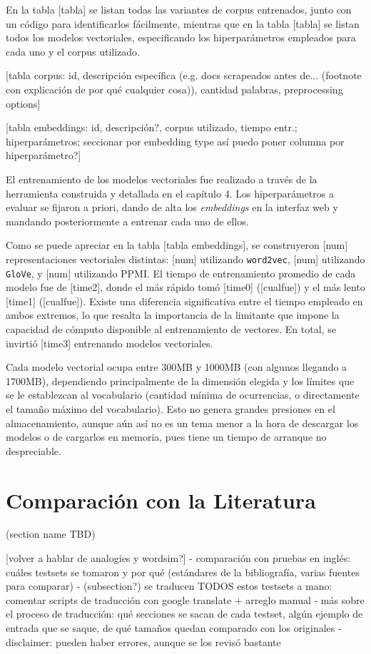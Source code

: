 En la tabla [tabla] se listan todas las variantes de corpus entrenados, junto con un código para
identificarlos fácilmente, mientras que en la tabla [tabla] se listan todos los modelos vectoriales,
especificando los hiperparámetros empleados para cada uno y el corpus utilizado.

[tabla corpus: id, descripción específica (e.g. docs scrapeados antes de... (footnote con
explicación de por qué cualquier cosa)), cantidad palabras, preprocessing options]

[tabla embeddings: id, descripción?, corpus utilizado, tiempo entr.; hiperparámetros; seccionar por
embedding type así puedo poner columna por hiperparámetro?]


El entrenamiento de los modelos vectoriales fue realizado a través de la herramienta construida y
detallada en el capítulo 4. Los hiperparámetros a evaluar se fijaron a priori, dando de alta los
\textit{embeddings} en la interfaz web y mandando posteriormente a entrenar cada uno de ellos.

Como se puede apreciar en la tabla [tabla embeddings], se construyeron [num] representaciones
vectoriales distintas: [num] utilizando \texttt{word2vec}, [num] utilizando \texttt{GloVe}, y [num]
utilizando PPMI\@. El tiempo de entrenamiento promedio de cada modelo fue de [time2], donde el más
rápido tomó [time0] ([cualfue]) y el más lento [time1] ([cualfue]). Existe una diferencia
significativa entre el tiempo empleado en ambos extremos, lo que resalta la importancia de la
limitante que impone la capacidad de cómputo disponible al entrenamiento de vectores. En total, se
invirtió [time3] entrenando modelos vectoriales.

Cada modelo vectorial ocupa entre 300MB y 1000MB (con algunos llegando a 1700MB), dependiendo
principalmente de la dimensión elegida y los límites que se le establezcan al vocabulario (cantidad
mínima de ocurrencias, o directamente el tamaño máximo del vocabulario). Esto no genera grandes
presiones en el almacenamiento, aunque aún así no es un tema menor a la hora de descargar los
modelos o de cargarlos en memoria, pues tiene un tiempo de arranque no despreciable.


\section{Comparación con la Literatura}
(section name TBD)

[volver a hablar de analogies y wordsim?]
- comparación con pruebas en inglés: cuáles testsets se tomaron y por qué (estándares de la bibliografía, varias fuentes para comparar)
- (subsection?) se traducen TODOS estos testsets a mano: comentar scripts de traducción con google translate + arreglo manual
    - más sobre el proceso de traducción: qué secciones se sacan de cada testset, algún ejemplo de entrada que se saque, de qué tamaños quedan comparado con los originales
    - disclaimer: pueden haber errores, aunque se los revisó bastante

